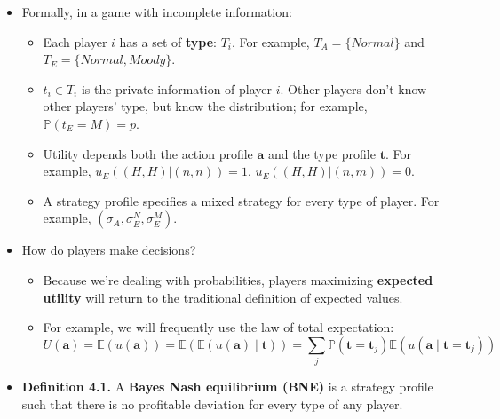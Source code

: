 \documentclass[notitlepage]{article}
\begin{document}
\begin{itemize}
    \begin{itemize}
        \item Because Eve's type is her \textbf{private information}, she can play her strategy accordingly: \(\sigma_E^N \in \Delta(\{H,R\})\) and \(\sigma_E^M \in \Delta(\{H,R\})\); but because Adam doesn't know, he can only play one strategy: \(\sigma_A \in \Delta(\{H,R\})\).
    \end{itemize}

    \item Formally, in a game with incomplete information:
    \begin{itemize}
        \item Each player \(i\) has a set of \textbf{type}: \(T_i\). For example, \(T_A = \{Normal\}\) and \(T_E = \{Normal, Moody\}\).
        \item \(t_i \in T_i\) is the private information of player \(i\). Other players don't know other players' type, but know the distribution; for example, \(\mathbb{P}(t_E = M) = p\).
        \item Utility depends both the action profile \(\mathbf{a}\) and the type profile \(\mathbf{t}\). For example, \(u_E((H,H)|(n,n)) = 1\), \(u_E((H,H)|(n,m)) = 0\).
        \item A strategy profile specifies a mixed strategy for every type of player. For example, \((\sigma_A, \sigma_E^N, \sigma_E^M)\).
    \end{itemize}

    \item How do players make decisions?
    \begin{itemize}
        \item Because we're dealing with probabilities, players maximizing \textbf{expected utility} will return to the traditional definition of expected values.
        \item For example, we will frequently use the law of total expectation: \[U(\textbf{a}) = \mathbb{E}(u(\textbf{a})) = \mathbb{E}(\mathbb{E}(u(\textbf{a}) \mid \mathbf{t})) = \sum_j \mathbb{P}(\mathbf{t} = \mathbf{t}_j)\mathbb{E}(u(\textbf{a}\mid \mathbf{t} = \mathbf{t}_j)) \]
    \end{itemize}

    \item \textbf{Definition 4.1.} A \textbf{Bayes Nash equilibrium (BNE)} is a strategy profile such that there is no profitable deviation for every type of any player.


\end{itemize}
\end{document}
